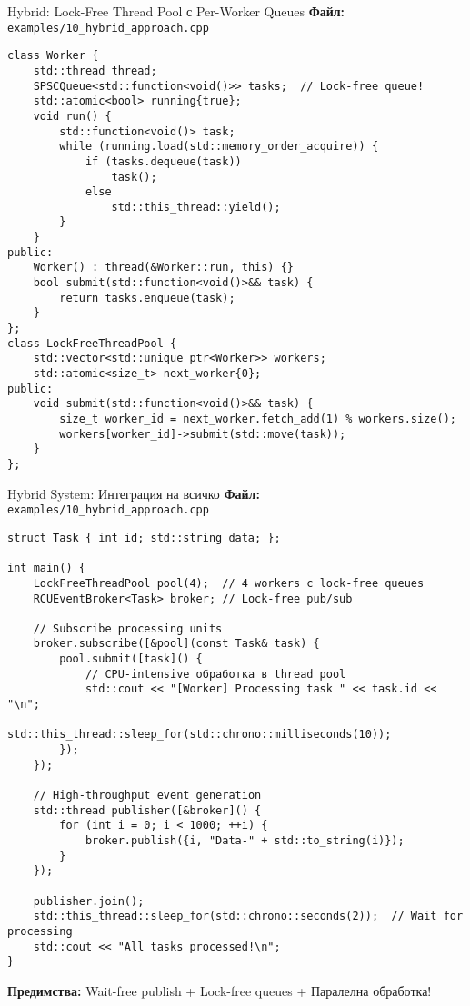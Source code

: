 \documentclass[aspectratio=169]{beamer}
\begin{document}
\begin{frame}[fragile]{Hybrid: Lock-Free Thread Pool с Per-Worker Queues}
\textbf{Файл:} \texttt{examples/10\_hybrid\_approach.cpp}
\begin{lstlisting}[basicstyle=\ttfamily\tiny]
class Worker {
    std::thread thread;
    SPSCQueue<std::function<void()>> tasks;  // Lock-free queue!
    std::atomic<bool> running{true};
    void run() {
        std::function<void()> task;
        while (running.load(std::memory_order_acquire)) {
            if (tasks.dequeue(task))
                task();
            else
                std::this_thread::yield();
        }
    }
public:
    Worker() : thread(&Worker::run, this) {}
    bool submit(std::function<void()>&& task) {
        return tasks.enqueue(task);
    }
};
class LockFreeThreadPool {
    std::vector<std::unique_ptr<Worker>> workers;
    std::atomic<size_t> next_worker{0};
public:
    void submit(std::function<void()>&& task) {
        size_t worker_id = next_worker.fetch_add(1) % workers.size();
        workers[worker_id]->submit(std::move(task));
    }
};
\end{lstlisting}
\end{frame}

\begin{frame}[fragile]{Hybrid System: Интеграция на всичко}
\textbf{Файл:} \texttt{examples/10\_hybrid\_approach.cpp}
\begin{lstlisting}[basicstyle=\ttfamily\tiny]
struct Task { int id; std::string data; };

int main() {
    LockFreeThreadPool pool(4);  // 4 workers с lock-free queues
    RCUEventBroker<Task> broker; // Lock-free pub/sub
    
    // Subscribe processing units
    broker.subscribe([&pool](const Task& task) {
        pool.submit([task]() {
            // CPU-intensive обработка в thread pool
            std::cout << "[Worker] Processing task " << task.id << "\n";
            std::this_thread::sleep_for(std::chrono::milliseconds(10));
        });
    });
    
    // High-throughput event generation
    std::thread publisher([&broker]() {
        for (int i = 0; i < 1000; ++i) {
            broker.publish({i, "Data-" + std::to_string(i)});
        }
    });
    
    publisher.join();
    std::this_thread::sleep_for(std::chrono::seconds(2));  // Wait for processing
    std::cout << "All tasks processed!\n";
}
\end{lstlisting}

\textbf{Предимства:} Wait-free publish + Lock-free queues + Паралелна обработка!
\end{frame}
\end{document}
